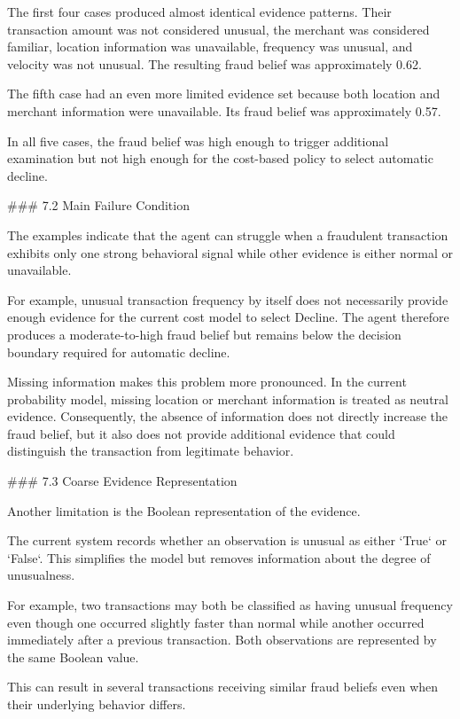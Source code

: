 The first four cases produced almost identical evidence patterns. Their transaction amount was not considered unusual, the merchant was considered familiar, location information was unavailable, frequency was unusual, and velocity was not unusual. The resulting fraud belief was approximately 0.62.

The fifth case had an even more limited evidence set because both location and merchant information were unavailable. Its fraud belief was approximately 0.57.

In all five cases, the fraud belief was high enough to trigger additional examination but not high enough for the cost-based policy to select automatic decline.

### 7.2 Main Failure Condition

The examples indicate that the agent can struggle when a fraudulent transaction exhibits only one strong behavioral signal while other evidence is either normal or unavailable.

For example, unusual transaction frequency by itself does not necessarily provide enough evidence for the current cost model to select Decline. The agent therefore produces a moderate-to-high fraud belief but remains below the decision boundary required for automatic decline.

Missing information makes this problem more pronounced. In the current probability model, missing location or merchant information is treated as neutral evidence. Consequently, the absence of information does not directly increase the fraud belief, but it also does not provide additional evidence that could distinguish the transaction from legitimate behavior.

### 7.3 Coarse Evidence Representation

Another limitation is the Boolean representation of the evidence.

The current system records whether an observation is unusual as either `True` or `False`. This simplifies the model but removes information about the degree of unusualness.

For example, two transactions may both be classified as having unusual frequency even though one occurred slightly faster than normal while another occurred immediately after a previous transaction. Both observations are represented by the same Boolean value.

This can result in several transactions receiving similar fraud beliefs even when their underlying behavior differs.

